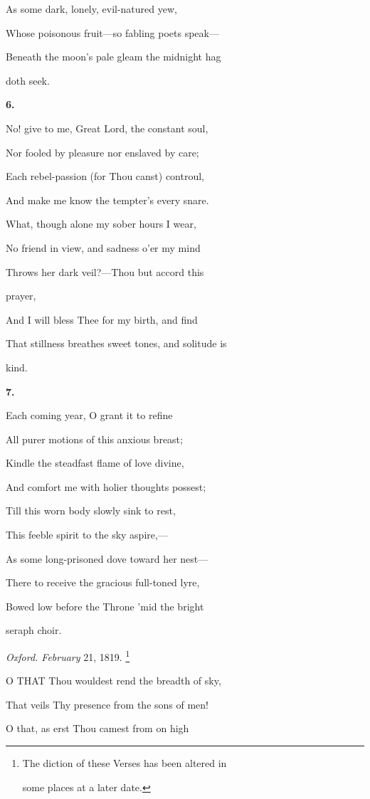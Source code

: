 As some dark, lonely, evil-natured yew,

Whose poisonous fruit—so fabling poets speak—

Beneath the moon's pale gleam the midnight hag

doth seek.

\textbf{6.}

No! give to me, Great Lord, the constant soul,

Nor fooled by pleasure nor enslaved by
care;

Each rebel-passion (for Thou canst) controul,

And make me know the tempter's every snare.

What, though alone my sober hours I wear,

No friend in view, and sadness o'er my mind

Throws her dark veil?—Thou but accord
this

prayer,

And I will bless Thee for my birth, and find

That stillness breathes sweet tones, and solitude is

kind.

\textbf{7.}

Each coming year, O grant it to refine

All purer motions of this anxious breast;

Kindle the steadfast flame of love divine,

And comfort me with holier thoughts possest;

Till this worn body slowly sink to rest,

This feeble spirit to the sky aspire,—

As some long-prisoned dove toward her nest—

There to receive the gracious full-toned lyre,

Bowed low before the Throne 'mid the bright

seraph choir.

\emph{Oxford. February} 21, 1819. \footnote{The diction of these Verses has been altered
in

some
places at a later date.}


O THAT Thou wouldest rend the breadth of sky,

That veils Thy presence from the sons of men!

O that, as erst Thou camest from on high


